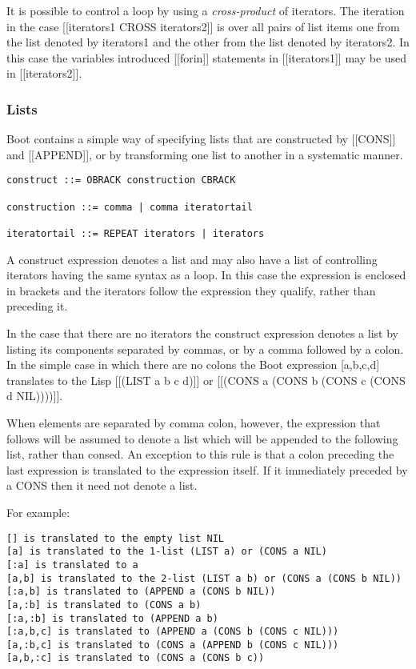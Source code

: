 \documentclass{article}
\begin{document}
It is possible to control a loop by using a \emph{cross-product} of iterators.
The iteration in the case [[iterators1 CROSS iterators2]] is over
all pairs of list items one from the list denoted by
iterators1 and the other from the list denoted by iterators2.
In this case the variables introduced [[forin]] statements in
[[iterators1]] may be used in [[iterators2]].

\subsubsection{Lists}
\label{sec:boot:list}

Boot contains a simple way of specifying lists that are constructed
by [[CONS]] and [[APPEND]], or by transforming one list to another in a
systematic manner.
\begin{verbatim}
construct ::= OBRACK construction CBRACK

construction ::= comma | comma iteratortail

iteratortail ::= REPEAT iterators | iterators
\end{verbatim}

A construct expression denotes a list and may also have a list
of controlling iterators having the same syntax as a loop. In this
case the expression is enclosed in brackets and the iterators follow
the expression they qualify, rather than preceding it.

In the case that there are no iterators the construct expression
denotes a list by listing its components separated by commas, or by
a comma followed by a colon. In the simple case in which there are no
colons the Boot expression [a,b,c,d] translates to the Lisp
[[(LIST a b c d)]] or [[(CONS a (CONS b (CONS c (CONS d NIL))))]].

When elements are separated by comma colon, however, the expression
that follows will be assumed to denote a list which will be appended
to the following list, rather than consed. An exception to this rule
is that a colon preceding the last expression is translated to
the expression itself. If it immediately preceded by a CONS
then it need not denote a list.

For example:
\begin{verbatim}
[] is translated to the empty list NIL
[a] is translated to the 1-list (LIST a) or (CONS a NIL)
[:a] is translated to a
[a,b] is translated to the 2-list (LIST a b) or (CONS a (CONS b NIL))
[:a,b] is translated to (APPEND a (CONS b NIL))
[a,:b] is translated to (CONS a b)
[:a,:b] is translated to (APPEND a b)
[:a,b,c] is translated to (APPEND a (CONS b (CONS c NIL)))
[a,:b,c] is translated to (CONS a (APPEND b (CONS c NIL)))
[a,b,:c] is translated to (CONS a (CONS b c))
\end{verbatim}
\end{document}
